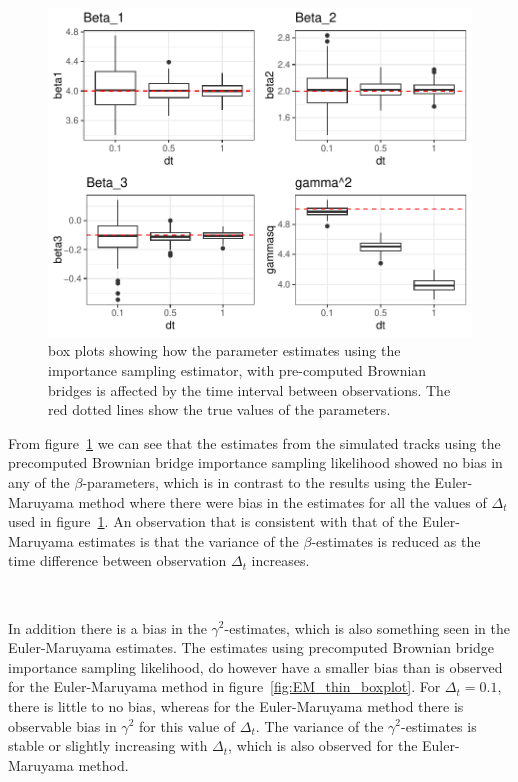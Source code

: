 \begin{figure}[H]
    \centering
    \includegraphics[width=\linewidth]{Images/Results/varying dt estimates precomputed BB.pdf}
    \caption[Box plots of Parameter Estimates for various observation intervals]{box plots showing how the parameter estimates using the importance sampling estimator, with pre-computed Brownian bridges is affected by the time interval between observations. The red dotted lines show the true values of the parameters.}
    \label{fig:varying dt boxplot precomputed BB}
\end{figure}


From figure~\ref{fig:varying dt boxplot precomputed BB} we can see that the estimates from the simulated tracks using the precomputed Brownian bridge importance sampling likelihood showed no bias in any of the $\beta$-parameters, which is in contrast to the results using the Euler-Maruyama method where there were bias in the estimates for all the values of $\Delta_t$ used in figure~\ref{fig:varying dt boxplot precomputed BB}. An observation that is consistent with that of the Euler-Maruyama estimates is that the variance of the $\beta$-estimates is reduced as the time difference between observation $\Delta_t$ increases. 

\

In addition there is a bias in the $\gamma^2$-estimates, which is also something seen in the Euler-Maruyama estimates. The estimates using precomputed Brownian bridge importance sampling likelihood, do however have a smaller bias than is observed for the Euler-Maruyama method in figure~\ref{fig:EM_thin_boxplot}. For $\Delta_t=0.1$, there is little to no bias, whereas for the Euler-Maruyama method there is observable bias in $\gamma^2$ for this value of $\Delta_t$. The variance of the $\gamma^2$-estimates is stable or slightly increasing with $\Delta_t$, which is also observed for the Euler-Maruyama method.





